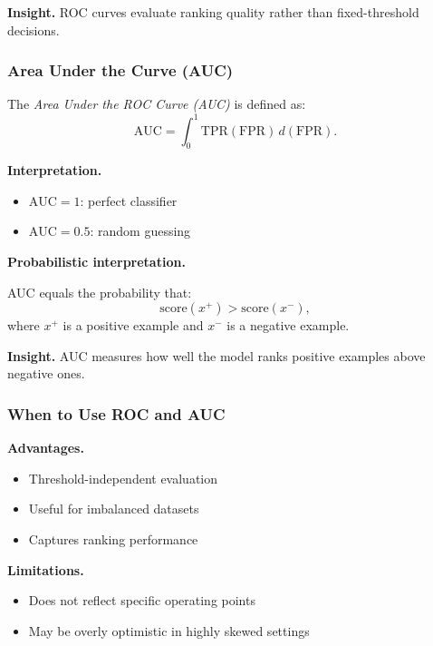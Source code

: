 \medskip

\noindent
\textbf{Insight.}  
ROC curves evaluate ranking quality rather than fixed-threshold decisions.

\subsubsection{Area Under the Curve (AUC)}

The \emph{Area Under the ROC Curve (AUC)} is defined as:
\[
\text{AUC} = \int_0^1 \text{TPR}(\text{FPR}) \, d(\text{FPR}).
\]

\medskip

\noindent
\textbf{Interpretation.}

\begin{itemize}
    \item $\text{AUC} = 1$: perfect classifier
    \item $\text{AUC} = 0.5$: random guessing
\end{itemize}

\medskip

\noindent
\textbf{Probabilistic interpretation.}

\medskip

\noindent
AUC equals the probability that:
\[
\text{score}(x^+) > \text{score}(x^-),
\]
where $x^+$ is a positive example and $x^-$ is a negative example.

\medskip

\noindent
\textbf{Insight.}  
AUC measures how well the model ranks positive examples above negative ones.

\subsubsection{When to Use ROC and AUC}

\textbf{Advantages.}

\begin{itemize}
    \item Threshold-independent evaluation
    \item Useful for imbalanced datasets
    \item Captures ranking performance
\end{itemize}

\medskip

\noindent
\textbf{Limitations.}

\begin{itemize}
    \item Does not reflect specific operating points
    \item May be overly optimistic in highly skewed settings
\end{itemize}

